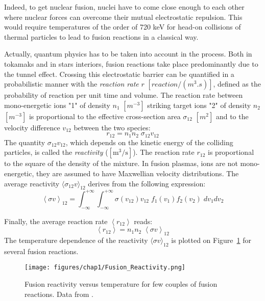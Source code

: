 Indeed, to get nuclear fusion, nuclei have to come close enough to each other where nuclear forces can overcome their mutual electrostatic repulsion. This would require temperatures of the order of 720 \si{keV} for head-on collisions of thermal particles to lead to fusion reactions in a classical way. 

Actually, quantum physics has to be taken into account in the process. Both in tokamaks and in stars interiors, fusion reactions take place predominantly due to the tunnel effect. Crossing this electrostatic barrier can be quantified in a probabilistic manner with the \textit{reaction rate} $r$ $[\si{reaction/(m^3.s)}]$, defined as the probability of reaction per unit time and volume. 
The reaction rate between mono-energetic ions "1" of density $n_1$ $[\si{m}^{-3}]$ striking target ions "2" of density $n_2$ $[\si{m}^{-3}]$ is proportional to the effective cross-section area $\sigma_{12}$ $[\si{m}^2]$ and to the velocity difference $v_{12}$ between the two species:
\begin{equation*}
	r_{12} = n_1 n_2 \; \sigma_{12} v_{12}
\end{equation*}
The quantity  $\sigma_{12} v_{12}$, which depends on the kinetic energy of the colliding particles, is called the \textit{reactivity} ($\mathrm{[m^3/s]}$). The reaction rate $r_{12}$ is proportional to the square of the density of the mixture. In fusion plasmas, ions are not mono-energetic, they are assumed to have Maxwellian velocity distributions. The average reactivity $\langle \sigma_{12} v \rangle_{12}$ derives from the following expression:
\begin{equation*}
	\left < \sigma v \right >_{12} 
	= \int_{-\infty}^{+\infty} \int_{-\infty}^{+\infty} 
	\sigma(v_{12}) v_{12}\;  f_1(v_1) f_2(v_2) \; dv_1dv_2
\end{equation*}

Finally, the average reaction rate $\left < r_{12} \right >$ reads:
\begin{equation*}
	\left < r_{12} \right > = n_1 n_2 \; \left < \sigma v \right >_{12}
\end{equation*}
The temperature dependence of the reactivity $\langle \sigma v \rangle_{12}$ is plotted on Figure~\ref{fig:chap1:reactivity} for several fusion reactions.

\begin{figure} 
	\centering
		\texttt{[image: figures/chap1/Fusion\_Reactivity.png]}
		\caption{Fusion reactivity versus temperature for few couples of fusion reactions. Data from .}
		\label{fig:chap1:reactivity}
\end{figure}


